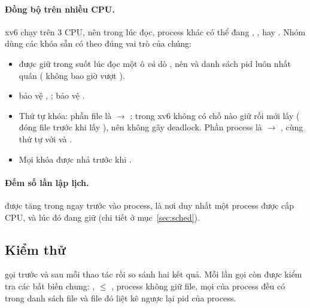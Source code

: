 \paragraph{Đồng bộ trên nhiều CPU.}
xv6 chạy trên 3 CPU, nên trong lúc  đọc, process khác có thể đang
, ,  hay . Nhóm dùng các khóa sẵn có
theo đúng vai trò của chúng:
\begin{itemize}
  \item {} được giữ trong suốt lúc đọc một ô \emph{và} dò
        , nên  và danh sách pid luôn nhất quán
        ( không bao giờ vượt ).
  \item {} bảo vệ , ;  bảo vệ
        .
  \item Thứ tự khóa: phần file là  $\to$ ; trong
        xv6 không có chỗ nào giữ  rồi mới lấy 
        ( đóng file trước khi lấy ), nên không gây
        deadlock. Phần process là  $\to$ , cùng
        thứ tự với  và .
  \item Mọi khóa được nhả trước khi .
\end{itemize}

\paragraph{Đếm số lần lập lịch.}
 được tăng trong  ngay trước  vào
process, là nơi duy nhất một process được cấp CPU, và lúc đó đang giữ
 (chi tiết ở mục~\ref{sec:sched}).

\subsection{Kiểm thử}
\label{sec:testing}

 gọi  trước và sau mỗi thao tác rồi so
sánh hai kết quả. Mỗi lần gọi còn được kiểm tra các bất biến chung: ,
 $\le$ , process  không giữ file, mọi
 của process đều có trong danh sách file và file đó liệt kê
ngược lại pid của process.

